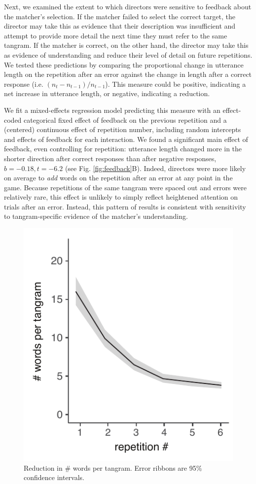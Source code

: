 \documentclass[alpha-refs]{wiley-article}
\begin{document}
Next, we examined the extent to which directors were sensitive to feedback about the matcher's selection.
If the matcher failed to select the correct target, the director may take this as evidence that their description was insufficient and attempt to provide more detail the next time they must refer to the same tangram. 
If the matcher is correct, on the other hand, the director may take this as evidence of understanding and reduce their level of detail on future repetitions.
We tested these predictions by comparing the proportional change in utterance length on the repetition after an error against the change in length after a correct response (i.e. $(n_t - n_{t-1})/n_{t-1}$).
This measure could be positive, indicating a net increase in utterance length, or negative, indicating a reduction.

We fit a mixed-effects regression model predicting this measure with an effect-coded categorical fixed effect of feedback on the previous repetition and a (centered) continuous effect of repetition number, including random intercepts and effects of feedback for each interaction.
We found a significant main effect of feedback, even controlling for repetition: utterance length changed more in the shorter direction after correct responses than after negative responses, $b = -0.18, t = -6.2$ (see Fig. \ref{fig:feedback}B).
Indeed, directors were more likely on average to \emph{add} words on the repetition after an error at any point in the game.
Because repetitions of the same tangram were spaced out and errors were relatively rare, this effect is unlikely to simply reflect heightened attention on trials after an error.
Instead, this pattern of results is consistent with sensitivity to tangram-specific evidence of the matcher's understanding.

\begin{figure}[t]
\centering
\includegraphics[scale=.6]{reduction.pdf}
\caption{Reduction in \# words per tangram. Error ribbons are 95\% confidence intervals.}
\label{fig:reduction}
\end{figure}
\end{document}
